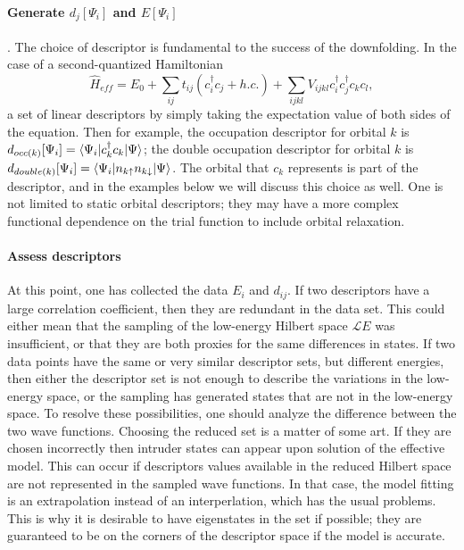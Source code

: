 \paragraph{Generate $d_j[\Psi_i]$ and $E[\Psi_i]$}. 
The choice of descriptor is fundamental to the success of the downfolding. 
In the case of a second-quantized Hamiltonian
\begin{equation}
\hat{H}_{eff} = E_0 + \sum_{ij} t_{ij} (c_i^\dagger c_j + h.c.) + \sum_{ijkl} V_{ijkl} c_i^\dagger c_j^\dagger c_k c_l,
\end{equation}
a set of linear descriptors by simply taking the expectation value of both sides of the equation. 
Then for example, the occupation descriptor for orbital $k$ is $d_{occ(k)}[\Psi_i] = \braket{\Psi_i | c_k^\dagger c_k | \Psi}$; the double occupation descriptor for orbital $k$ is $d_{double(k)}[\Psi_i] = \braket{\Psi_i | n_{k\uparrow}n_{k\downarrow} | \Psi}$. 
The orbital that $c_k$ represents is part of the descriptor, and in the examples below we will discuss this choice as well.
One is not limited to static orbital descriptors; they may have a more complex functional dependence on the trial function to include orbital relaxation.

 
\paragraph{Assess descriptors}
At this point, one has collected the data $E_i$ and $d_{ij}$. 
If two descriptors have a large correlation coefficient, then they are redundant in the data set. 
This could either mean that the sampling of the low-energy Hilbert space ${\mathcal LE}$ was insufficient, or that they are both proxies for the same differences in states. 
If two data points have the same or very similar descriptor sets, but different energies, then either the descriptor set is not enough to describe the variations in the low-energy space, or the sampling has generated states that are not in the low-energy space.
To resolve these possibilities, one should analyze the difference between the two wave functions.  
Choosing the reduced set is a matter of some art. 
If they are chosen incorrectly then intruder states can appear upon solution of the effective model. 
This can occur if descriptors values available in the reduced Hilbert space are not represented in the sampled wave functions. 
In that case, the model fitting is an extrapolation instead of an interperlation, which has the usual problems.
This is why it is desirable to have eigenstates in the set if possible; they are guaranteed to be on the corners of the descriptor space if the model is accurate.


